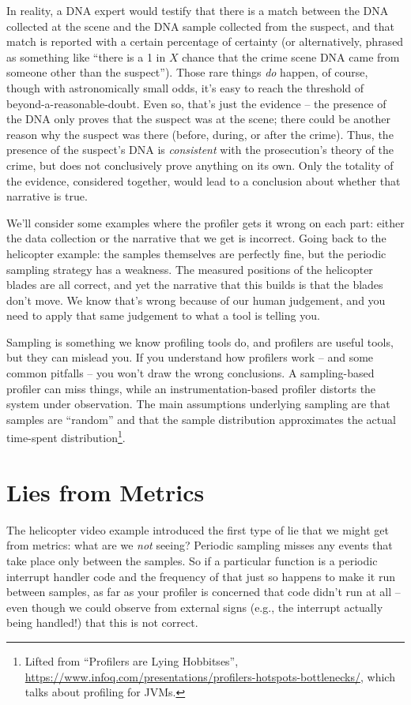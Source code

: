 In reality, a DNA expert would testify that there is a match between the DNA collected at the scene and the DNA sample collected from the suspect, and that match is reported with a certain percentage of certainty (or alternatively, phrased as something like ``there is a 1 in $X$ chance that the crime scene DNA came from someone other than the suspect''). Those rare things \textit{do} happen, of course, though with astronomically small odds, it's easy to reach the threshold of beyond-a-reasonable-doubt. Even so, that's just the evidence -- the presence of the DNA only proves that the suspect was at the scene; there could be another reason why the suspect was there (before, during, or after the crime). Thus, the presence of the suspect's DNA is \textit{consistent} with the prosecution's theory of the crime, but does not conclusively prove anything on its own. Only the totality of the evidence, considered together, would lead to a conclusion about whether that narrative is true.

We'll consider some examples where the profiler gets it wrong on each part: either the data collection or the narrative that we get is incorrect. Going back to the helicopter example: the samples themselves are perfectly fine, but the periodic sampling strategy has a weakness. The measured positions of the helicopter blades are all correct, and yet the narrative that this builds is that the blades don't move. We know that's wrong because of our human judgement, and you need to apply that same judgement to what a tool is telling you.

Sampling is something we know profiling tools do, and profilers
are useful tools, but they can mislead you. If you understand how
profilers work -- and some common pitfalls -- you won't draw the wrong conclusions. A sampling-based profiler can miss things, while an instrumentation-based profiler distorts the system under observation. The main assumptions underlying sampling are that samples are ``random'' and that the sample distribution approximates the actual time-spent distribution\footnote{Lifted from ``Profilers are Lying Hobbitses'', \url{https://www.infoq.com/presentations/profilers-hotspots-bottlenecks/}, which talks about profiling for JVMs.}.

\section*{Lies from Metrics}
The helicopter video example introduced the first type of lie that we might get from metrics: what are we \textit{not} seeing? Periodic sampling misses any events that take place only between the samples. So if a particular function is a periodic interrupt handler code and the frequency of that just so happens to make it run between samples, as far as your profiler is concerned that code didn't run at all -- even though we could observe from external signs (e.g., the interrupt actually being handled!) that this is not correct.

